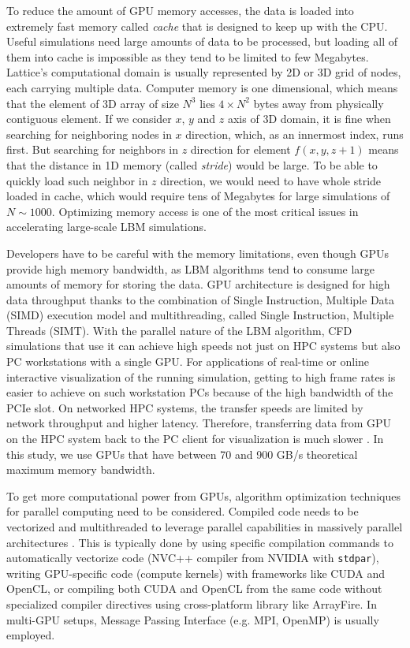 To reduce the amount of GPU memory accesses, the data is loaded into extremely fast memory called \emph{cache} that is designed to keep up with the CPU. Useful simulations need large amounts of data to be processed, but loading all of them into cache is impossible as they tend to be limited to few Megabytes. Lattice's computational domain is usually represented by 2D or 3D grid of nodes, each carrying multiple data. Computer memory is one dimensional, which means that the element of 3D array of size $N^3$ lies $4 \times N^2$ bytes away from physically contiguous element. If we consider $x$, $y$ and $z$ axis of 3D domain, it is fine when searching for neighboring nodes in $x$ direction, which, as an innermost index, runs first. But searching for neighbors in $z$ direction for element $f(x,y,z+1)$ means that the distance in 1D memory (called \emph{stride}) would be large. To be able to quickly load such neighbor in $z$ direction, we would need to have whole stride loaded in cache, which would require tens of Megabytes for large simulations of $N \sim 1000$. Optimizing memory access is one of the most critical issues in accelerating large-scale LBM simulations.

Developers have to be careful with the memory limitations, even though GPUs provide high memory bandwidth, as LBM algorithms tend to consume large amounts of memory for storing the data. GPU architecture is designed for high data throughput thanks to the combination of Single Instruction, Multiple Data (SIMD) execution model and multithreading, called Single Instruction, Multiple Threads (SIMT). With the parallel nature of the LBM algorithm, CFD simulations that use it can achieve high speeds not just on HPC systems but also PC workstations with a single GPU. For applications of real-time or online interactive visualization of the running simulation, getting to high frame rates is easier to achieve on such workstation PCs because of the high bandwidth of the PCIe slot. On networked HPC systems, the transfer speeds are limited by network throughput and higher latency. Therefore, transferring data from GPU on the HPC system back to the PC client for visualization is much slower \cite{linxweilerHighlyInteractiveComputational2010}. In this study, we use GPUs that have between 70 and 900 GB/s theoretical maximum memory bandwidth.



To get more computational power from GPUs, algorithm optimization techniques for parallel computing need to be considered. Compiled code needs to be vectorized and multithreaded to leverage parallel capabilities in massively parallel architectures \cite{delboscOptimizedImplementationLattice2014}. This is typically done by using specific compilation commands to automatically vectorize code (NVC++ compiler from NVIDIA with \texttt{stdpar}), writing GPU-specific code (compute kernels) with frameworks like CUDA and OpenCL, or compiling both CUDA and OpenCL from the same code without specialized compiler directives using cross-platform library like ArrayFire. In multi-GPU setups, Message Passing Interface (e.g. MPI, OpenMP) is usually employed.

